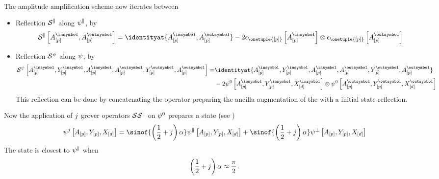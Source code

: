 The amplitude amplification scheme now iterates between
\begin{itemize}
    \item Reflection $\mathcal{S}^{\parallel}$ along $\psi^{\parallel}$, by
    \begin{align*}
        \reflectionofat{\goodstatesymbol}{\cavariableof{[\seldim]}{\insymbol},\cavariableof{[\seldim]}{\outsymbol}}
        = \identityat{\cavariableof{[\seldim]}{\insymbol},\cavariableof{[\seldim]}{\outsymbol}}
        - 2 \onehotmapofat{\onetuple{[\seldim]}}{\cavariableof{[\seldim]}{\insymbol}}
        \otimes \onehotmapofat{\onetuple{[\seldim]}}{\cavariableof{[\seldim]}{\outsymbol}}
    \end{align*}
    \item Reflection $\mathcal{S}^{\psi}$ along $\psi$, by
    \begin{align*}
        \reflectionofat{\qstate}{\cavariableof{[\seldim]}{\insymbol},\cheadvariableof{[\seldim]}{\insymbol},\cavariableof{[\seldim]}{\insymbol},\cavariableof{[\seldim]}{\outsymbol},\cheadvariableof{[\seldim]}{\outsymbol},\cavariableof{[\seldim]}{\outsymbol}}
        =& \identityat{\cavariableof{[\seldim]}{\insymbol},\cheadvariableof{[\seldim]}{\insymbol},\cavariableof{[\seldim]}{\insymbol},\cavariableof{[\seldim]}{\outsymbol},\cheadvariableof{[\seldim]}{\outsymbol},\cavariableof{[\seldim]}{\outsymbol}} \\
        &- 2 \qstateofat{0}{\cavariableof{[\seldim]}{\insymbol},\cheadvariableof{[\seldim]}{\insymbol},\ccatvariableof{[\catorder]}{\insymbol}} \otimes
        \qstateofat{0}{\cavariableof{[\seldim]}{\outsymbol},\cheadvariableof{[\seldim]}{\outsymbol},\ccatvariableof{[\catorder]}{\outsymbol}}
    \end{align*}
    This reflection can be done by concatenating the operator preparing the ancilla-augmentation of the \ComputationActivationNetwork{} with a initial state reflection.
\end{itemize}

Now the application of $j$ grover operators $\mathcal{S}^{}\mathcal{S}^{\parallel}$ on $\psi^{0}$ prepares a state (see )
\begin{align*}
    \qstateofat{\repnum}{\avariables,\headvariables,\shortcatvariables}
    = \sinof{\left(\frac{1}{2}+\repnum\right)\rotanglesymbol} \qstateofat{\goodstatesymbol}{\avariables,\headvariables,\shortcatvariables}
    + \sinof{\left(\frac{1}{2}+\repnum\right)\rotanglesymbol} \qstateofat{\badstatesymbol}{\avariables,\headvariables,\shortcatvariables}
\end{align*}
The state is closest to $\psi^{\parallel}$ when
\begin{align*}
    \left(\frac{1}{2}+j\right)
    \alpha \approx \frac{\pi}{2} \, .
\end{align*}

